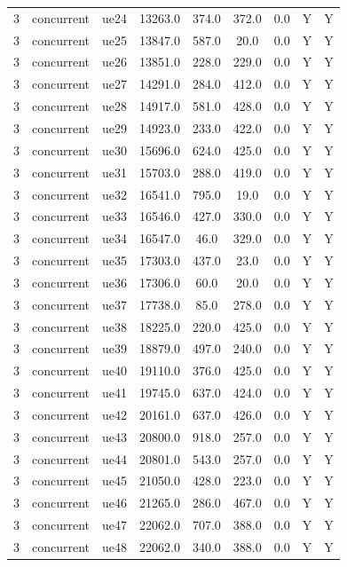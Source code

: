 \begin{table}[ht]
\begin{tabular}{|c|c|c|c|c|c|c|c|c|}
3 & concurrent & ue24 & 13263.0 & 374.0 & 372.0 & 0.0 & Y & Y \\
3 & concurrent & ue25 & 13847.0 & 587.0 & 20.0 & 0.0 & Y & Y \\
3 & concurrent & ue26 & 13851.0 & 228.0 & 229.0 & 0.0 & Y & Y \\
3 & concurrent & ue27 & 14291.0 & 284.0 & 412.0 & 0.0 & Y & Y \\
3 & concurrent & ue28 & 14917.0 & 581.0 & 428.0 & 0.0 & Y & Y \\
3 & concurrent & ue29 & 14923.0 & 233.0 & 422.0 & 0.0 & Y & Y \\
3 & concurrent & ue30 & 15696.0 & 624.0 & 425.0 & 0.0 & Y & Y \\
3 & concurrent & ue31 & 15703.0 & 288.0 & 419.0 & 0.0 & Y & Y \\
3 & concurrent & ue32 & 16541.0 & 795.0 & 19.0 & 0.0 & Y & Y \\
3 & concurrent & ue33 & 16546.0 & 427.0 & 330.0 & 0.0 & Y & Y \\
3 & concurrent & ue34 & 16547.0 & 46.0 & 329.0 & 0.0 & Y & Y \\
3 & concurrent & ue35 & 17303.0 & 437.0 & 23.0 & 0.0 & Y & Y \\
3 & concurrent & ue36 & 17306.0 & 60.0 & 20.0 & 0.0 & Y & Y \\
3 & concurrent & ue37 & 17738.0 & 85.0 & 278.0 & 0.0 & Y & Y \\
3 & concurrent & ue38 & 18225.0 & 220.0 & 425.0 & 0.0 & Y & Y \\
3 & concurrent & ue39 & 18879.0 & 497.0 & 240.0 & 0.0 & Y & Y \\
3 & concurrent & ue40 & 19110.0 & 376.0 & 425.0 & 0.0 & Y & Y \\
3 & concurrent & ue41 & 19745.0 & 637.0 & 424.0 & 0.0 & Y & Y \\
3 & concurrent & ue42 & 20161.0 & 637.0 & 426.0 & 0.0 & Y & Y \\
3 & concurrent & ue43 & 20800.0 & 918.0 & 257.0 & 0.0 & Y & Y \\
3 & concurrent & ue44 & 20801.0 & 543.0 & 257.0 & 0.0 & Y & Y \\
3 & concurrent & ue45 & 21050.0 & 428.0 & 223.0 & 0.0 & Y & Y \\
3 & concurrent & ue46 & 21265.0 & 286.0 & 467.0 & 0.0 & Y & Y \\
3 & concurrent & ue47 & 22062.0 & 707.0 & 388.0 & 0.0 & Y & Y \\
3 & concurrent & ue48 & 22062.0 & 340.0 & 388.0 & 0.0 & Y & Y \\

\end{tabular}
\end{table}
